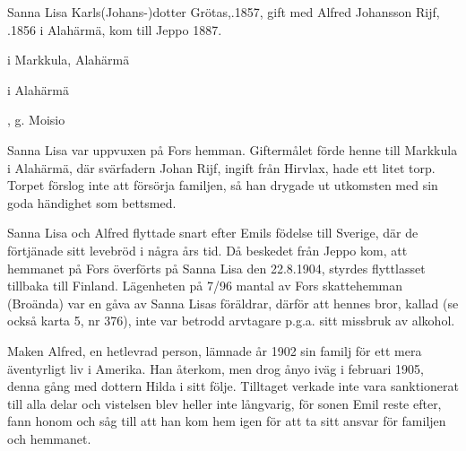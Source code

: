 %
Sanna Lisa Karls(Johans-)dotter Grötas,.1857, gift med Alfred Johansson Rijf, .1856 i Alahärmä, kom till Jeppo 1887.
\begin{jhchildren}
  \item {} i Markkula, Alahärmä
  \item {} i Alahärmä
  \item {}, g. Moisio
  \item {}
\end{jhchildren}
Sanna Lisa var uppvuxen på Fors hemman. Giftermålet förde henne till Markkula i Alahärmä, där svärfadern Johan Rijf, ingift från Hirvlax, hade ett litet torp. Torpet förslog inte att försörja familjen, så han drygade ut utkomsten med sin goda händighet som bettsmed.

Sanna Lisa och Alfred flyttade snart efter Emils födelse till Sverige, där de förtjänade sitt levebröd i några års tid. Då  beskedet från Jeppo kom, att hemmanet på Fors överförts på Sanna Lisa den 22.8.1904, styrdes flyttlasset tillbaka till Finland. Lägenheten på 7/96 mantal av Fors skattehemman (Broända) var en gåva av Sanna Lisas föräldrar, därför att hennes bror, kallad  (se också karta 5, nr 376), inte var betrodd arvtagare p.g.a. sitt missbruk av alkohol.

Maken Alfred, en hetlevrad person, lämnade år 1902 sin familj för ett mera äventyrligt liv i Amerika. Han återkom, men drog ånyo iväg i	februari 1905, denna gång med dottern Hilda i sitt följe. Tilltaget	verkade inte vara sanktionerat till alla delar och vistelsen blev heller	inte långvarig, för sonen Emil reste efter, fann honom och såg till att	han kom hem igen för att ta sitt ansvar för familjen och hemmanet.



